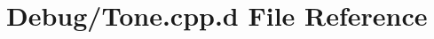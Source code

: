 \hypertarget{_debug_2_tone_8cpp_8d}{\section{\-Debug/\-Tone.cpp.\-d \-File \-Reference}
\label{_debug_2_tone_8cpp_8d}
}
